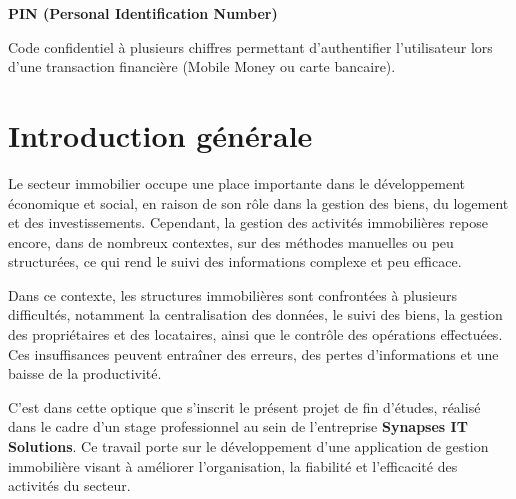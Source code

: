 \documentclass[12pt,a4paper]{report}
\newcommand{\important}[1]{\textcolor{cuivre}{\textbf{#1}}}
\begin{document}
\begin{infobox}
\textbf{PIN (Personal Identification Number)}

Code confidentiel à plusieurs chiffres permettant d'authentifier l'utilisateur lors d'une transaction financière (Mobile Money ou carte bancaire).
\end{infobox}


\newpage
\renewcommand{\contentsname}{Table des matières}
\tableofcontents

\newpage

\chapter*{Introduction générale}

Le secteur immobilier occupe une place importante dans le développement économique et social, en raison de son rôle dans la gestion des biens, du logement et des investissements. Cependant, la gestion des activités immobilières repose encore, dans de nombreux contextes, sur des méthodes manuelles ou peu structurées, ce qui rend le suivi des informations complexe et peu efficace.

\vspace{0.4cm}

Dans ce contexte, les structures immobilières sont confrontées à plusieurs difficultés, notamment la centralisation des données, le suivi des biens, la gestion des propriétaires et des locataires, ainsi que le contrôle des opérations effectuées. Ces insuffisances peuvent entraîner des erreurs, des pertes d'informations et une baisse de la productivité.

\vspace{0.4cm}

C'est dans cette optique que s'inscrit le présent projet de fin d'études, réalisé dans le cadre d'un stage professionnel au sein de l'entreprise \important{Synapses IT Solutions}. Ce travail porte sur le développement d'une application de gestion immobilière visant à améliorer l'organisation, la fiabilité et l'efficacité des activités du secteur.

\vspace{0.4cm}
\end{document}
